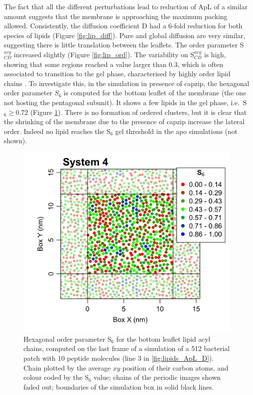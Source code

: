 The fact that all the different perturbations lead to reduction of ApL of a similar amount suggests that the membrane is approaching the maximum packing allowed.
%
Consistently, the diffusion coefficient D had a 6-fold reduction for both species of lipids (Figure \ref{fig:lip_diff}). Pure and global diffusion are very similar, suggesting there is little translation between the leaflets.
%
The order parameter S$^{avg}_{CD}$ increased slightly (Figure \ref{fig:lip_ord}). The variability on S$^{avg}_{CD}$ is high, showing that some regions reached a value larger than 0.3, which is often associated to transition to the gel phase, characterised by highly order lipid chains \citep{Pluhackova2016}.
%
To investigate this, in the simulation in presence of capzip, the hexagonal order parameter $S_6$ is computed for the bottom leaflet of the membrane (the one not hosting the pentagonal subunit). It shows a few lipids in the gel phase, i.e.\ S$_6 \ge 0.72$ (Figure \ref{fig:S6_pb4}). There is no formation of ordered clusters, but it is clear that the shrinking of the membrane due to the presence of capzip increase the lateral order. Indeed no lipid reaches the S$_6$ gel threshold in the apo simulations (not shown).
%
\begin{figure}[h!]
\centering
\includegraphics[width=0.5\linewidth]{3results_capsule/pics/pb4_S6.png} 
\caption[Hexagonal order parameter of lipids in protein-lipid simulation]{Hexagonal order parameter S$_6$ for the bottom leaflet lipid acyl chains, computed on the last frame of a simulation of a 512 bacterial patch with 10 peptide molecules (line 3 in \ref{fig:lipids_ApL_D}). Chain plotted by the average $xy$ position of their carbon atoms, and colour coded by the S$_6$ value; chains of the periodic images shown faded out; boundaries of the simulation box in solid black lines.}
\label{fig:S6_pb4}
\end{figure}

